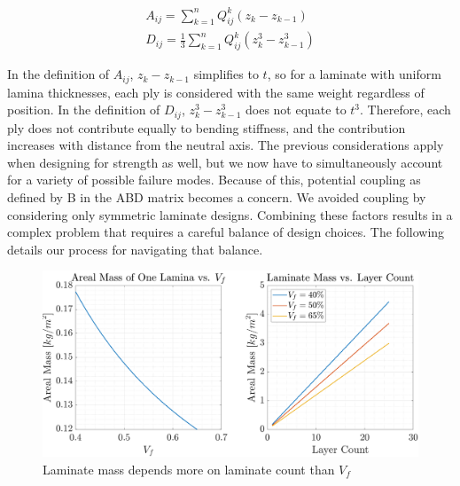 \documentclass[12pt]{article}
\begin{document}

\begin{align}
    A_{ij}=\sum^n_{k=1}Q^k_{ij}(z_k-z_{k-1}) \\
    D_{ij}=\frac{1}{3}\sum^n_{k=1}Q^k_{ij}(z_k^3-z_{k-1}^3)
\end{align}

In the definition of $A_{ij}$, $z_k-z_{k-1}$ simplifies to $t$, so for a laminate with uniform lamina thicknesses, each ply is considered with the same weight regardless of position. In the definition of $D_{ij}$, $z_k^3-z_{k-1}^3$ does not equate to $t^3$. Therefore, each ply does not contribute equally to bending stiffness, and the contribution increases with distance from the neutral axis. The previous considerations apply when designing for strength as well, but we now have to simultaneously account for a variety of possible failure modes. Because of this, potential coupling as defined by B in the ABD matrix becomes a concern. We avoided coupling by considering only symmetric laminate designs. Combining these factors results in a complex problem that requires a careful balance of design choices. The following details our process for navigating that balance. 



\begin{figure}
    \centering
    \includegraphics[width=0.99\linewidth]{massChange.png}
    \caption{Laminate mass depends more on laminate count than $V_f$}
    \label{fig:massChange}
\end{figure}
\end{document}
